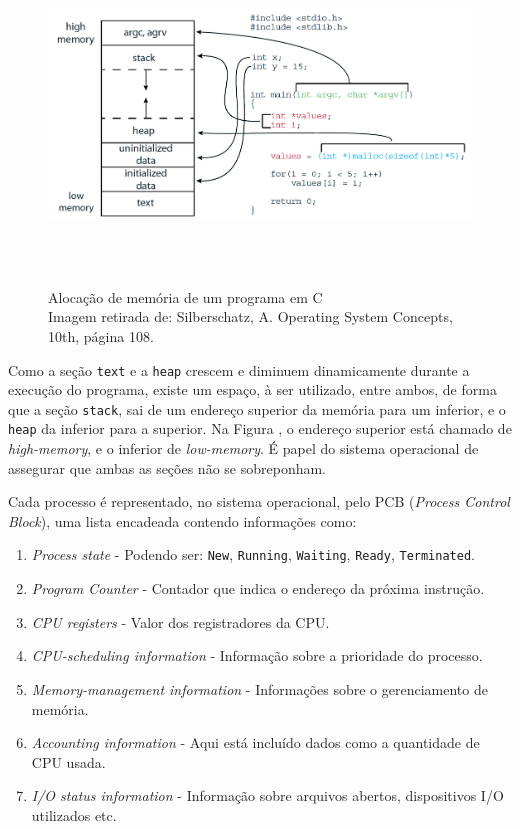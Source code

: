 \begin{figure}[h!]
\centering
\includegraphics[keepaspectratio, width=12cm, height=9cm]{imagens/03/03 - Alocação de memória de um programa c.png}
\caption{Alocação de memória de um programa em C \\
Imagem retirada de: Silberschatz, A. Operating System Concepts, 10th,
página 108. \\}
\label{fig:Alocação de memória de um programa em C}
\end{figure}




Como a seção \texttt{text} e a \texttt{heap} crescem e diminuem
dinamicamente durante a execução do programa, existe um espaço, à ser
utilizado, entre ambos, de forma que a seção \texttt{stack}, sai de um
endereço superior da memória para um inferior, e o \texttt{heap} da
inferior para a superior. Na Figura \label{fig:Alocação de memória de um programa em C}, o endereço superior está chamado
de \emph{high-memory}, e o inferior de \emph{low-memory}. É papel do
sistema operacional de assegurar que ambas as seções não se sobreponham.

Cada processo é representado, no sistema operacional, pelo PCB
(\emph{Process Control Block}), uma lista encadeada contendo informações
como:

\begin{enumerate}
\def\labelenumi{\arabic{enumi}.}

\item
  \emph{Process state} - Podendo ser: \texttt{New}, \texttt{Running},
  \texttt{Waiting}, \texttt{Ready}, \texttt{Terminated}.
\item
  \emph{Program Counter} - Contador que indica o endereço da próxima
  instrução.
\item
  \emph{CPU registers} - Valor dos registradores da CPU.
\item
  \emph{CPU-scheduling information} - Informação sobre a prioridade do
  processo.
\item
  \emph{Memory-management information} - Informações sobre o
  gerenciamento de memória.
\item
  \emph{Accounting information} - Aqui está incluído dados como a
  quantidade de CPU usada.
\item
  \emph{I/O status information} - Informação sobre arquivos abertos,
  dispositivos I/O utilizados etc.
\end{enumerate}

